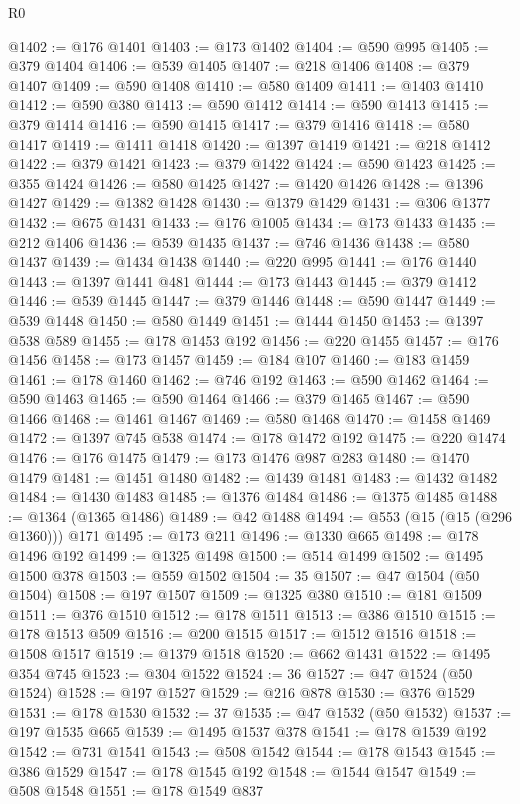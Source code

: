 \begin{lexlean}{R0}
\begin{coremodule}
@1402 := @176 @1401
@1403 := @173 @1402
@1404 := @590 @995
@1405 := @379 @1404
@1406 := @539 @1405
@1407 := @218 @1406
@1408 := @379 @1407
@1409 := @590 @1408
@1410 := @580 @1409
@1411 := @1403 @1410
@1412 := @590 @380
@1413 := @590 @1412
@1414 := @590 @1413
@1415 := @379 @1414
@1416 := @590 @1415
@1417 := @379 @1416
@1418 := @580 @1417
@1419 := @1411 @1418
@1420 := @1397 @1419
@1421 := @218 @1412
@1422 := @379 @1421
@1423 := @379 @1422
@1424 := @590 @1423
@1425 := @355 @1424
@1426 := @580 @1425
@1427 := @1420 @1426
@1428 := @1396 @1427
@1429 := @1382 @1428
@1430 := @1379 @1429
@1431 := @306 @1377
@1432 := @675 @1431
@1433 := @176 @1005
@1434 := @173 @1433
@1435 := @212 @1406
@1436 := @539 @1435
@1437 := @746 @1436
@1438 := @580 @1437
@1439 := @1434 @1438
@1440 := @220 @995
@1441 := @176 @1440
@1443 := @1397 @1441 @481
@1444 := @173 @1443
@1445 := @379 @1412
@1446 := @539 @1445
@1447 := @379 @1446
@1448 := @590 @1447
@1449 := @539 @1448
@1450 := @580 @1449
@1451 := @1444 @1450
@1453 := @1397 @538 @589
@1455 := @178 @1453 @192
@1456 := @220 @1455
@1457 := @176 @1456
@1458 := @173 @1457
@1459 := @184 @107
@1460 := @183 @1459
@1461 := @178 @1460
@1462 := @746 @192
@1463 := @590 @1462
@1464 := @590 @1463
@1465 := @590 @1464
@1466 := @379 @1465
@1467 := @590 @1466
@1468 := @1461 @1467
@1469 := @580 @1468
@1470 := @1458 @1469
@1472 := @1397 @745 @538
@1474 := @178 @1472 @192
@1475 := @220 @1474
@1476 := @176 @1475
@1479 := @173 @1476 @987 @283
@1480 := @1470 @1479
@1481 := @1451 @1480
@1482 := @1439 @1481
@1483 := @1432 @1482
@1484 := @1430 @1483
@1485 := @1376 @1484
@1486 := @1375 @1485
@1488 := @1364 (@1365 @1486)
@1489 := @42 @1488
@1494 := @553 (@15 (@15 (@296 @1360))) @171
@1495 := @173 @211
@1496 := @1330 @665
@1498 := @178 @1496 @192
@1499 := @1325 @1498
@1500 := @514 @1499
@1502 := @1495 @1500 @378
@1503 := @559 @1502
@1504 := 35
@1507 := @47 @1504 (@50 @1504)
@1508 := @197 @1507
@1509 := @1325 @380
@1510 := @181 @1509
@1511 := @376 @1510
@1512 := @178 @1511
@1513 := @386 @1510
@1515 := @178 @1513 @509
@1516 := @200 @1515
@1517 := @1512 @1516
@1518 := @1508 @1517
@1519 := @1379 @1518
@1520 := @662 @1431
@1522 := @1495 @354 @745
@1523 := @304 @1522
@1524 := 36
@1527 := @47 @1524 (@50 @1524)
@1528 := @197 @1527
@1529 := @216 @878
@1530 := @376 @1529
@1531 := @178 @1530
@1532 := 37
@1535 := @47 @1532 (@50 @1532)
@1537 := @197 @1535 @665
@1539 := @1495 @1537 @378
@1541 := @178 @1539 @192
@1542 := @731 @1541
@1543 := @508 @1542
@1544 := @178 @1543
@1545 := @386 @1529
@1547 := @178 @1545 @192
@1548 := @1544 @1547
@1549 := @508 @1548
@1551 := @178 @1549 @837

\end{coremodule}
\end{lexlean}
